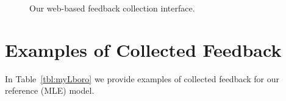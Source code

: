 \begin{figure}[H]
\vspace{-3mm}
\centering
{}
  \vspace{-1mm}
  \caption{Our web-based feedback collection interface. }
  \label{fig:feedbackwebt}
  \vspace{-1mm}
\end{figure}

\vspace{-3mm}
\section{Examples of Collected Feedback}
\vspace{-2mm}

In Table~\ref{tbl:myLboro} we provide examples of collected feedback for our reference (MLE) model. %

